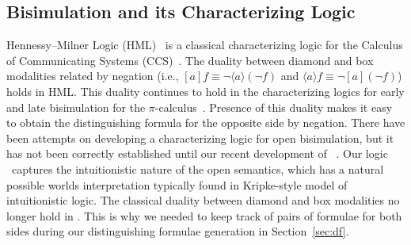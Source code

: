 \subsection{Bisimulation and its Characterizing Logic}
\label{sec:relwork:logic}
Hennessy--Milner Logic (HML)~\cite{HenMil80hml} is a classical
characterizing logic for the Calculus of Communicating Systems (CCS)~\cite{Mil82ccs}.
The duality between diamond and box modalities related by negation 
(i.e., $[a]f \equiv \neg\langle a\rangle(\neg f)$ and $\langle a\rangle f \equiv \neg[a](\neg f)$)
holds in HML. This duality continues to hold in the characterizing logics for
early and late bisimulation for the $\pi$-calculus~\cite{MilParWal93lm}.
Presence of this duality makes it easy to obtain the distinguishing formula
for the opposite side by negation.
There have been attempts \cite{TiuMil10,ParBorEriGutWeb15} on developing
a characterizing logic for open bisimulation, but it has not been correctly
established until our recent development of \OM~\cite{AhnHorTiu17corr}.
Our logic \OM\ captures the intuitionistic nature of the open semantics, which
has a natural possible worlds interpretation typically found in Kripke-style model
of intuitionistic logic. The classical duality between diamond and box modalities
no longer hold in \OM. This is why we needed to keep track of pairs of formulae
for both sides %
during our distinguishing formulae generation in Section~\ref{sec:df}.%
\vspace*{-1ex}
